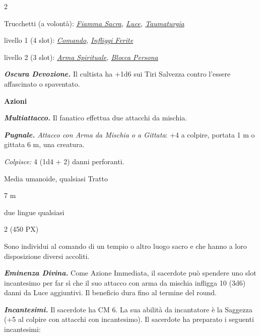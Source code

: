 \begin{multicols}{2}
{Trucchetti (a volontà): \emph{\hyperlink{Fiamma Sacra}{Fiamma Sacra}, \hyperlink{Luce}{Luce}, \hyperlink{Taumaturgia}{Taumaturgia}}

livello 1 (4 slot): \emph{\hyperlink{Comando}{Comando}, \hyperlink{Infliggi Ferite}{Infliggi Ferite}}

livello 2 (3 slot): \emph{\hyperlink{Arma Spirituale}{Arma Spirituale}, \hyperlink{Blocca Persona}{Blocca Persona}}

\emph{\textbf{Oscura Devozione.}} Il cultista ha +1d6 sui Tiri Salvezza contro l'essere affascinato o spaventato.

\textbf{Azioni}

\emph{\textbf{Multiattacco.}} Il fanatico effettua due attacchi da mischia.

\emph{\textbf{Pugnale.} Attacco con Arma da Mischia o a Gittata}: +4 a colpire, portata 1 m o gittata 6 m, una creatura.

\emph{Colpisce:} 4 (1d4 + 2) danni perforanti.

\begin{description}[noitemsep, topsep=0pt, parsep=0pt, partopsep=0pt, itemsep=1pt, leftmargin=2.35cm,  labelwidth=2.2cm, itemindent=0cm, listparindent=0pt] %
\setlength{\baselineskip}{10pt}
\item[\textbf{Taglia/Tipo}] Media umanoide, qualsiasi Tratto
\item[\textbf{Caratt.}] 
\item[\textbf{Punti Ferita}] 
\item[\textbf{Tiri Salvez.}] 
\item[\textbf{Movimento}] 7 m
\item[\textbf{Linguaggi}] due lingue qualsiasi
\item[\textbf{Sfida}] 2 (450 PX)
\end{description}
\smallskip

Sono individui al comando di un tempio o altro luogo sacro e che hanno a loro disposizione diversi accoliti.

\emph{\textbf{Eminenza Divina.}} Come Azione Immediata, il sacerdote può spendere uno slot incantesimo per far sì che il suo attacco con arma da mischia infligga 10 (3d6) danni da Luce aggiuntivi. Il beneficio dura fino al termine del round.

\emph{\textbf{Incantesimi.}} Il sacerdote ha CM 6. La sua abilità da incantatore è la Saggezza (+5 al colpire con attacchi con incantesimo). Il sacerdote ha preparato i seguenti incantesimi:

}
\end{multicols}
